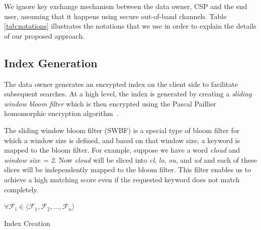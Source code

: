 We ignore key exchange mechanism between the data owner, CSP and the end user, assuming
that it happens using secure out-of-band channels.
Table \ref{tab:notations} illustrates the notations that we use in order to explain
the details of our proposed approach.


\subsection{Index Generation}

The data owner generates an encrypted index on the client side to facilitate
subsequent searches. At a high level, the index is generated by creating a 
\textit{sliding window bloom filter} which is then encrypted using the Pascal Paillier
homomorphic encryption algorithm~\cite{pascal}. 

The sliding window bloom filter (SWBF) is a special type of bloom filter
for which a window size is defined, and based on that
window size, a keyword is mapped to the bloom filter. For example, suppose we have a word
\emph{cloud} and \emph {window size = 2}. Now \emph{cloud} will be sliced into
\emph{cl}, \emph{lo}, \emph{ou}, and \emph{ud} and each of these slices will be 
independently mapped to the bloom filter. This filter enables us to achieve
 a high matching score even if the requested keyword does not match completely.

\begin{algorithm}
$ \forall \mathcal{F}_i \in \langle \mathcal{F}_1, \mathcal{F}_2, \ldots,
\mathcal{F}_n \rangle$\;
\;
 \caption{Index Creation}
 \label{algo:IndexCreation}
\end{algorithm}

